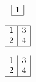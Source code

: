 \documentclass{article}
\begin{document}
\[\begin{array}{|c|}\hline 1\\\hline\end{array}\]

\[
\begin{array}{|c|c|}\hline
1&3\\2&4\\\hline
\end{array}\]

\[
\begin{array}{|c|c|}
1&3\\2&4\\\hline
\end{array}\]
\end{document}
